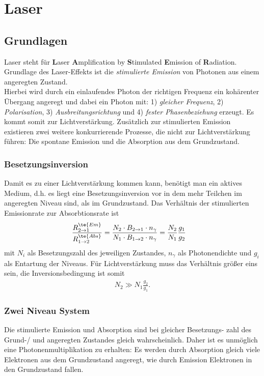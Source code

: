 \documentclass[twocolumn]{summery_4.1}
\begin{document}
\section{Laser}
\subsection{Grundlagen}
Laser steht für {\bf \large L}aser {\bf\large A}mplification by {\bf\large S}timulated {\bf\large E}mission of {\bf\large R}adiation.\\[1ex]
Grundlage des Laser-Effekts ist die \emph{stimulierte Emission} von Photonen aus einem angeregten Zustand. \\
Hierbei wird durch ein einlaufendes Photon der richtigen Frequenz ein kohärenter Übergang angeregt und dabei ein Photon mit: 
1) \emph{gleicher Frequenz}, 2) \emph{Polarisation}, 3) \emph{Ausbreitungsrichtung} und 4)
\emph{fester Phasenbeziehung} erzeugt. Es kommt somit zur Lichtverstärkung.
Zusätzlich zur stimulierten Emission existieren zwei weitere konkurrierende Prozesse, die nicht zur Lichtverstärkung führen: Die spontane Emission und die Absorption aus dem Grundzustand.\\[1ex]

\subsubsection{Besetzungsinversion}
Damit es zu einer Lichtverstärkung kommen kann, benötigt man ein aktives Medium, d.h. es liegt eine Besetzungsinversion vor in dem mehr Teilchen im angeregten Niveau sind, als im Grundzustand. Das Verhältnis der stimulierten Emissionrate zur Absorbtionsrate ist 
\begin{align*}
    \frac{R_{2\to 1}^{\te{Em}}}{R_{1\to 2}^{\te{Abs}}} &= \frac{N_2 \cdot B_{2\to 1} \cdot n_\gamma }{ N_1 \cdot B_{1\to 2} \cdot n_\gamma } = \frac{N_2}{N_1} \frac{g_1}{g_2}
\end{align*}
mit \(N_{i}\) als Besetzungszahl des jeweiligen Zustandes, \(n_\gamma\) als Photonendichte und \(g_{i}\) als Entartung der Niveaus. Für Lichtverstärkung muss das Verhältnis größer eins sein, die Inversionsbedingung ist somit 
\begin{align*}
    N_2 \gg N_1 \frac{g_2}{g_1}.
\end{align*}

\subsubsection{Zwei Niveau System}
Die stimulierte Emission und Absorption sind bei gleicher Besetzungs-
zahl des Grund-/ und angeregten Zustandes gleich wahrscheinlich. Daher ist es
unmöglich eine Photonenmultiplikation zu erhalten: Es werden durch Absorption gleich viele Elektronen aus dem Grundzustand angeregt, wie durch Emission
Elektronen in den Grundzustand fallen.
\end{document}
